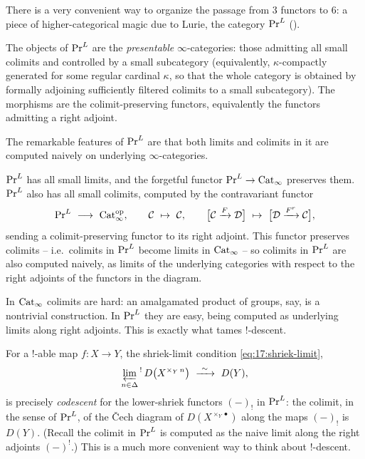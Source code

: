 There is a very convenient way to organize the passage from $3$ functors to $6$: a piece of
higher-categorical magic due to Lurie, the category $\PrL$ (\cite{lurie2017higher}).

\begin{definition}[$\PrL$]
\label{def:17:PrL}
The objects of $\PrL$ are the \emph{presentable} $\infty$-categories: those admitting all
small colimits and controlled by a small subcategory (equivalently, $\kappa$-compactly
generated for some regular cardinal $\kappa$, so that the whole category is obtained by
formally adjoining sufficiently filtered colimits to a small subcategory). The morphisms are
the colimit-preserving functors, equivalently the functors admitting a right adjoint.
\end{definition}

The remarkable features of $\PrL$ are that both limits and colimits in it are computed
naively on underlying $\infty$-categories.

\begin{proposition}
\label{prop:17:PrL-limits}
$\PrL$ has all small limits, and the forgetful functor $\mathrm{Pr}^{L}\to\mathrm{Cat}_{\infty}$ preserves them.
$\PrL$ also has all small colimits, computed by the contravariant functor
\begin{equation*}
\PrL\ \longrightarrow\ \Catinf^{\mathrm{op}},\qquad
\mathcal C\ \mapsto\ \mathcal C,\qquad
\bigl[\mathcal C\xrightarrow{F}\mathcal D\bigr]\ \mapsto\ \bigl[\mathcal D\xrightarrow{F^{r}}\mathcal C\bigr],
\end{equation*}
sending a colimit-preserving functor to its right adjoint. This functor preserves
colimits -- i.e.\ colimits in $\PrL$ become limits in $\mathrm{Cat}_{\infty}$ -- so colimits in $\PrL$
are also computed naively, as limits of the underlying categories with respect to the right
adjoints of the functors in the diagram.
\end{proposition}

\begin{remark}
\label{rmk:17:magic}
In $\mathrm{Cat}_{\infty}$ colimits are hard: an amalgamated product of groups, say, is a nontrivial
construction. In $\PrL$ they are easy, being computed as underlying limits along right
adjoints. This is exactly what tames $!$-descent.
\end{remark}

\begin{corollary}
\label{cor:17:descent-codescent}
For a $!$-able map $f\colon X\to Y$, the shriek-limit condition
\eqref{eq:17:shriek-limit},
\[
\varprojlim_{n\in\Delta}{}^{!}\,D\bigl(X^{\times_{Y}\,n}\bigr)\ \xrightarrow{\ \sim\ }\ D(Y),
\]
is precisely \emph{codescent} for the lower-shriek functors $(-)_{!}$ in $\PrL$: the
colimit, in the sense of $\PrL$, of the \v{C}ech diagram of $D(X^{\times_{Y}\bullet})$
along the maps $(-)_{!}$ is $D(Y)$. (Recall the colimit in $\PrL$ is computed as the naive
limit along the right adjoints $(-)^{!}$.) This is a much more convenient way to think about
$!$-descent.
\end{corollary}

